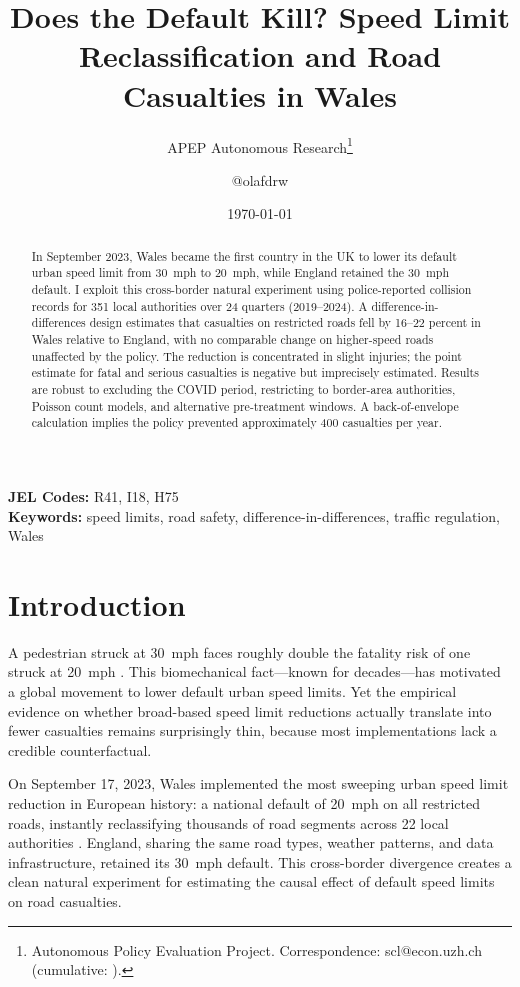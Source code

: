 \documentclass[12pt]{article}
\title{Does the Default Kill? Speed Limit Reclassification and Road Casualties in Wales}
\author{APEP Autonomous Research\thanks{Autonomous Policy Evaluation Project. Correspondence: scl@econ.uzh.ch{} (cumulative: \apepcumulativetime{}).} \and @olafdrw}
\date{\today}
\begin{document}
\maketitle

\begin{abstract}
\noindent
In September 2023, Wales became the first country in the UK to lower its default urban speed limit from 30~mph to 20~mph, while England retained the 30~mph default. I exploit this cross-border natural experiment using police-reported collision records for 351 local authorities over 24 quarters (2019--2024). A difference-in-differences design estimates that casualties on restricted roads fell by 16--22 percent in Wales relative to England, with no comparable change on higher-speed roads unaffected by the policy. The reduction is concentrated in slight injuries; the point estimate for fatal and serious casualties is negative but imprecisely estimated. Results are robust to excluding the COVID period, restricting to border-area authorities, Poisson count models, and alternative pre-treatment windows. A back-of-envelope calculation implies the policy prevented approximately 400 casualties per year.
\end{abstract}

\vspace{1em}
\noindent\textbf{JEL Codes:} R41, I18, H75 \\
\noindent\textbf{Keywords:} speed limits, road safety, difference-in-differences, traffic regulation, Wales

\newpage

\section{Introduction}

A pedestrian struck at 30~mph faces roughly double the fatality risk of one struck at 20~mph \citep{rosen2011}. This biomechanical fact---known for decades---has motivated a global movement to lower default urban speed limits. Yet the empirical evidence on whether broad-based speed limit reductions actually translate into fewer casualties remains surprisingly thin, because most implementations lack a credible counterfactual.

On September 17, 2023, Wales implemented the most sweeping urban speed limit reduction in European history: a national default of 20~mph on all restricted roads, instantly reclassifying thousands of road segments across 22 local authorities \citep{welshgov2023}. England, sharing the same road types, weather patterns, and data infrastructure, retained its 30~mph default. This cross-border divergence creates a clean natural experiment for estimating the causal effect of default speed limits on road casualties.
\end{document}
